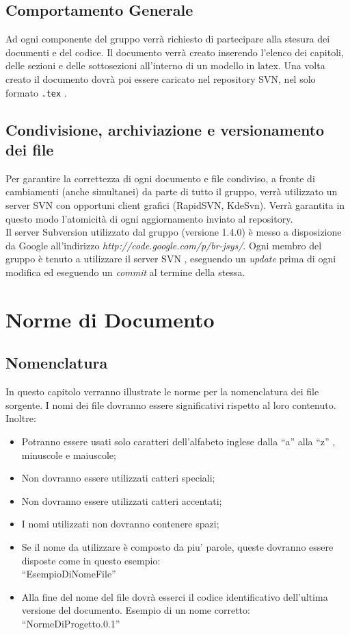 \section{Comportamento Generale}
Ad ogni componente del gruppo verr\`a richiesto di partecipare alla stesura dei documenti e del codice. Il documento verr\`a creato inserendo l'elenco dei capitoli, delle sezioni e delle sottosezioni all'interno di un modello in latex. Una volta creato il documento dovr\`a poi essere caricato nel repository SVN, nel solo formato \texttt{.tex} .
\section[Condivisione dei file]{Condivisione, archiviazione e versionamento dei file}
Per garantire la correttezza di ogni documento e file condiviso, a fronte di cambiamenti (anche simultanei) da parte di tutto il gruppo, verr\`a  utilizzato un server SVN con opportuni client grafici (RapidSVN, KdeSvn). Verr\`a garantita in questo modo l'atomicit\`a di ogni aggiornamento inviato al repository.\\ 
Il server Subversion utilizzato dal gruppo (versione 1.4.0) \`e messo a disposizione da Google all'indirizzo \textit{http://code.google.com/p/br-jsys/}.
\newline
 \newline
Ogni membro del gruppo \`e tenuto a utilizzare il server SVN , eseguendo un \textit{update} prima di ogni modifica ed eseguendo un \textit{commit} al termine della stessa.

\chapter{Norme di Documento}
\section{Nomenclatura}
In questo capitolo verranno illustrate le norme per la nomenclatura dei file sorgente. I nomi dei file dovranno essere significativi rispetto al loro contenuto. Inoltre:
\begin{itemize}
\item Potranno essere usati solo caratteri dell'alfabeto inglese dalla ``a'' alla ``z'' , minuscole e maiuscole;
\item Non dovranno essere utilizzati catteri speciali;
\item Non dovranno essere utilizzati catteri accentati;
\item I nomi utilizzati non dovranno contenere spazi;
\item Se il nome da utilizzare \`e composto da piu' parole, queste dovranno essere disposte come in questo esempio: \\
``EsempioDiNomeFile''
\item Alla fine del nome del file dovr\`a esserci il codice identificativo dell'ultima versione del documento.
Esempio di un nome corretto:\\
``NormeDiProgetto.0.1''
\end{itemize}
